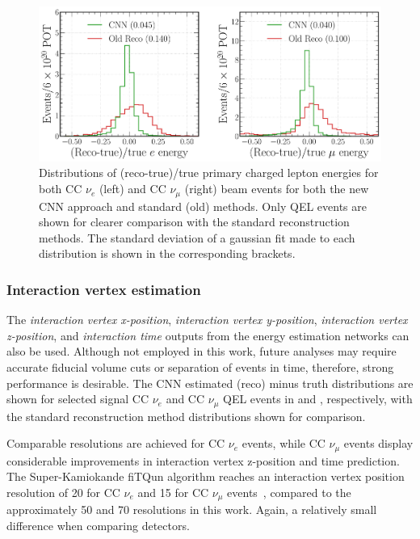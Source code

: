 \begin{figure} %
    \includegraphics[width=\textwidth]{diagrams/7-results/final_frac_e_comparison.pdf}
    \caption[Distributions of (reco-true)/true primary charged lepton energies for the CNN and
        standard methods] {Distributions of (reco-true)/true primary charged lepton energies for
        both CC $\nu_{e}$ (left) and CC $\nu_{\mu}$ (right) beam events for both the new CNN
        approach and standard (old) methods. Only QEL events are shown for clearer comparison with
        the standard reconstruction methods. The standard deviation of a gaussian fit made to each
        distribution is shown in the corresponding brackets.}
    \label{fig:final_frac_e_comparison}
\end{figure}

\subsubsection*{Interaction vertex estimation} %

The \emph{interaction vertex x-position}, \emph{interaction vertex y-position}, \emph{interaction
    vertex z-position}, and \emph{interaction time} outputs from the energy estimation networks
    can also be used. Although not employed in this work, future analyses may require accurate
    fiducial volume cuts or separation of events in time, therefore, strong performance is
    desirable. The CNN estimated (reco) minus truth distributions are shown for selected signal CC
    $\nu_{e}$ and CC $\nu_{\mu}$ QEL events in 
    and , respectively, with the standard
    reconstruction method distributions shown for comparison.

Comparable resolutions are achieved for CC $\nu_{e}$ events, while CC $\nu_{\mu}$ events display
considerable improvements in interaction vertex z-position and time prediction. The
Super-Kamiokande fiTQun algorithm reaches an interaction vertex position resolution of
\unit{20}{} for CC $\nu_{e}$ and \unit{15}{} for CC $\nu_{\mu}$
events~\cite{jiang2019}, compared to the approximately \unit{50}{} and
\unit{70}{} resolutions in this work. Again, a relatively small difference when comparing
detectors.

